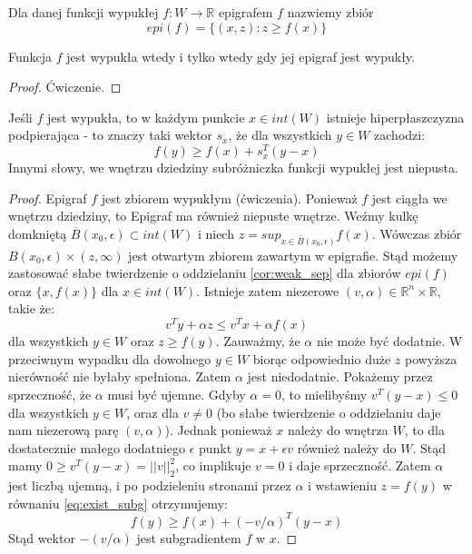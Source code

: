 \documentclass[10pt,a4paper,draft]{report}
\begin{document}
\begin{definition}[Epigraf]
Dla danej funkcji wypukłej $f : W \rightarrow \mathbb{R}$ epigrafem $f$ nazwiemy zbiór
\[
epi (f) = \{ (x,z) : z \geq f(x) \}
\]
\end{definition}


\begin{theorem}
Funkcja $f$ jest wypukła wtedy i tylko wtedy gdy jej epigraf jest wypukły.
\end{theorem}
\begin{proof}
Ćwiczenie.
\end{proof}

\begin{theorem}
Jeśli $f$ jest wypukła, to w każdym punkcie $x \in int(W)$ istnieje hiperpłaszczyzna podpierająca - to znaczy taki wektor $s_x$, że dla wszystkich $y \in W$ zachodzi:
\[
f(y) \geq f(x) + s_x^T (y - x)
\]
Innymi słowy, we wnętrzu dziedziny subróżniczka funkcji wypukłej jest niepusta.
\end{theorem}
\begin{proof}
Epigraf $f$ jest zbiorem wypukłym (ćwiczenia). Ponieważ $f$ jest ciągła we wnętrzu dziedziny, to Epigraf ma również niepuste wnętrze. Weźmy kulkę domkniętą $\overline{B}(x_0, \epsilon) \subset int(W)$ i niech $z = sup_{x \in \overline{B}(x_0, \epsilon)} f(x)$. Wówczas zbiór $B(x_0, \epsilon) \times (z, \infty)$ jest otwartym zbiorem zawartym w epigrafie. Stąd możemy zastosować słabe twierdzenie o oddzielaniu \ref{cor:weak_sep} dla zbiorów $epi(f)$ oraz $\{x, f(x)\}$ dla $x \in int(W)$. Istnieje zatem niezerowe $(v, \alpha) \in \mathbb{R}^n \times \mathbb{R}$, takie że:
\begin{equation}\label{eq:exist_subg}
v^T y + \alpha z \leq v^T x + \alpha f(x)
\end{equation}
dla wszystkich $y \in W$ oraz $z \geq f(y)$. Zauważmy, że $\alpha$ nie może być dodatnie. W przeciwnym wypadku dla dowolnego $y \in W$ biorąc odpowiednio duże $z$ powyższa nierówność nie byłaby spełniona. Zatem $\alpha$ jest niedodatnie. Pokażemy przez sprzeczność, że $\alpha$ musi być ujemne. Gdyby $\alpha = 0$, to mielibyśmy $v^T(y - x) \leq 0$ dla wszystkich $y \in W$, oraz dla $v \neq 0$ (bo słabe twierdzenie o oddzielaniu daje nam niezerową parę $(v, \alpha)$). Jednak ponieważ $x$ należy do wnętrza $W$, to dla dostatecznie małego dodatniego $\epsilon$ punkt $y = x + \epsilon v$ również należy do $W$. Stąd mamy $0 \geq v^T(y - x) = ||v||_2^2$, co implikuje $v = 0$ i daje sprzeczność. Zatem $\alpha$ jest liczbą ujemną, i po podzieleniu stronami przez $\alpha$ i wstawieniu $z = f(y)$ w równaniu \ref{eq:exist_subg} otrzymujemy:
\[
f(y) \geq f(x) + (-v/\alpha)^T(y - x)
\]
Stąd wektor $-(v/\alpha)$ jest subgradientem $f$ w $x$. 
\end{proof}
\end{document}
